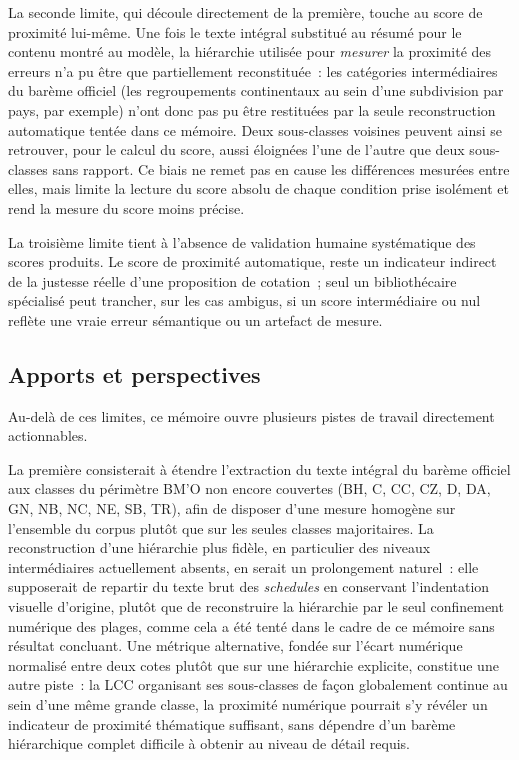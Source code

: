 La seconde limite, qui découle directement de la première, touche au score de proximité lui-même. Une fois le texte intégral substitué au résumé pour le contenu montré au modèle, la hiérarchie utilisée pour \emph{mesurer} la proximité des erreurs n'a pu être que partiellement reconstituée~: les catégories intermédiaires du barème officiel (les regroupements continentaux au sein d'une subdivision par pays, par exemple) n'ont donc pas pu être restituées par la seule reconstruction automatique tentée dans ce mémoire. Deux sous-classes voisines peuvent ainsi se retrouver, pour le calcul du score, aussi éloignées l'une de l'autre que deux sous-classes sans rapport. Ce biais ne remet pas en cause les différences mesurées entre elles, mais limite la lecture du score absolu de chaque condition prise isolément et rend la mesure du score moins précise.

La troisième limite tient à l'absence de validation humaine systématique des scores produits. Le score de proximité automatique, reste un indicateur indirect de la justesse réelle d'une proposition de cotation~; seul un bibliothécaire spécialisé peut trancher, sur les cas ambigus, si un score intermédiaire ou nul reflète une vraie erreur sémantique ou un artefact de mesure. 

\subsection*{Apports et perspectives}

Au-delà de ces limites, ce mémoire ouvre plusieurs pistes de travail directement actionnables.

La première consisterait à étendre l'extraction du texte intégral du barème officiel aux classes du périmètre BM'O non encore couvertes (BH, C, CC, CZ, D, DA, GN, NB, NC, NE, SB, TR), afin de disposer d'une mesure homogène sur l'ensemble du corpus plutôt que sur les seules classes majoritaires. La reconstruction d'une hiérarchie plus fidèle, en particulier des niveaux intermédiaires actuellement absents, en serait un prolongement naturel~: elle supposerait de repartir du texte brut des \textit{schedules} en conservant l'indentation visuelle d'origine, plutôt que de reconstruire la hiérarchie par le seul confinement numérique des plages, comme cela a été tenté dans le cadre de ce mémoire sans résultat concluant. Une métrique alternative, fondée sur l'écart numérique normalisé entre deux cotes plutôt que sur une hiérarchie explicite, constitue une autre piste~: la LCC organisant ses sous-classes de façon globalement continue au sein d'une même grande classe, la proximité numérique pourrait s'y révéler un indicateur de proximité thématique suffisant, sans dépendre d'un barème hiérarchique complet difficile à obtenir au niveau de détail requis.

